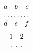 \documentclass{article}
\begin{document}
\[\begin{matrix} a & b & c \\ \hdotsfor{3} \\ d & e & f \end{matrix}\]
\[\begin{matrix} 1 & 2 \\ \hdotsfor[2]{2} \end{matrix}\]
\end{document}
